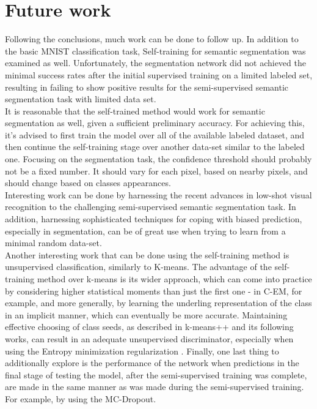 \documentclass[conference, letterpaper]{IEEEtran}
\begin{document}
\section{Future work}
Following the conclusions, much work can be done to follow up.
In addition to the basic MNIST classification task, Self-training for semantic segmentation was examined as well.
Unfortunately, the segmentation network did not achieved the minimal success rates after the initial supervised training on a limited labeled set, resulting in failing to show positive results for the semi-supervised semantic segmentation task with limited data set.\\
It is reasonable that the self-trained method would work for semantic segmentation as well, given a sufficient preliminary accuracy. For achieving this, it's advised to first train the model over all of the available labeled dataset, and then continue the self-training stage over another data-set similar to the labeled one. %
Focusing on the segmentation task, the confidence threshold should probably not be a fixed number. It should vary for each pixel, based on nearby pixels, and should change based on classes appearances.\\
Interesting work can be done by harnessing the recent advances in low-shot visual recognition \cite{hariharan2016low} to the challenging semi-supervised semantic segmentation task. In addition, harnessing sophisticated techniques for coping with biased prediction, especially in segmentation\cite{bulo2017loss}, can be of great use when trying to learn from a minimal random data-set.\\
Another interesting work that can be done using the self-training method is unsupervised classification, similarly to K-means. The advantage of the self-training method over k-means is its wider approach, which can come into practice by considering higher statistical moments than just the first one - in C-EM, for example, and more generally, by learning the underling representation of the class in an implicit manner, which can eventually be more accurate. Maintaining effective choosing of class seeds, as described in k-means++ \cite{arthur2007k} and its following works, can result in an adequate unsupervised discriminator, especially when using the Entropy minimization regularization \cite{grandvalet2005semi}.
Finally, one last thing to additionally explore is the performance of the network when predictions in the final stage of testing the model, after the semi-supervised training was complete, are made in the same manner as was made during the semi-supervised training. For example, by using the MC-Dropout.
\end{document}
